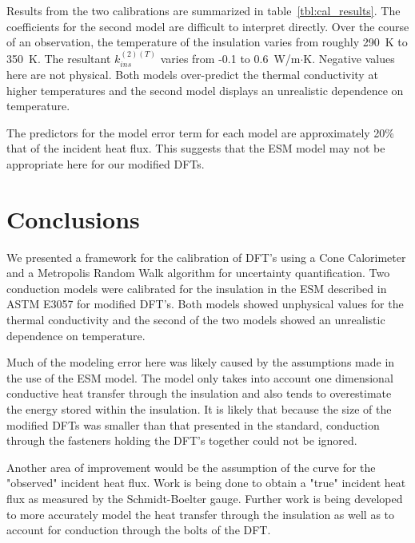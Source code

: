 \documentclass[article]{proc}
\begin{document}
        Results from the two calibrations are summarized in table~\ref{tbl:cal_results}. The coefficients for the second model are difficult to interpret directly. Over the course of an observation, the temperature of the insulation varies from roughly 290~K to 350~K. The resultant $k_{ins}^{(2)(T)}$ varies from -0.1 to 0.6~W/m$\cdot$K. Negative values here are not physical. Both models over-predict the thermal conductivity at higher temperatures and the second model displays an unrealistic dependence on temperature. 

        The predictors for the model error term for each model are approximately 20\% that of the incident heat flux. This suggests that the ESM model may not be appropriate here for our modified DFTs.

\section{Conclusions}

    We presented a framework for the calibration of DFT's using a Cone Calorimeter and a Metropolis Random Walk algorithm for uncertainty quantification. Two conduction models were calibrated for the insulation in the ESM described in ASTM E3057 for modified DFT's. Both models showed unphysical values for the thermal conductivity and the second of the two models showed an unrealistic dependence on temperature. 

    Much of the modeling error here was likely caused by the assumptions made in the use of the ESM model. The model only takes into account one dimensional conductive heat transfer through the insulation and also tends to overestimate the energy stored within the insulation. It is likely that because the size of the modified DFTs was smaller than that presented in the standard, conduction through the fasteners holding the DFT's together could not be ignored. 

    Another area of improvement would be the assumption of the curve for the "observed" incident heat flux. Work is being done to obtain a "true" incident heat flux as measured by the Schmidt-Boelter gauge. Further work is being developed to more accurately model the heat transfer through the insulation as well as to account for conduction through the bolts of the DFT.
    
\clearpage

\scriptsize{

}
\end{document}
